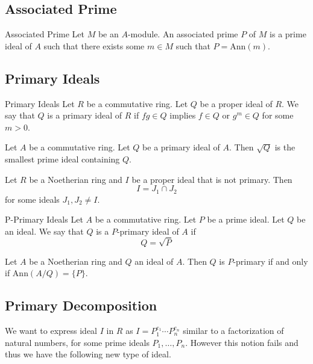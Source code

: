 \documentclass[a4paper]{article}
\begin{document}
\subsection{Associated Prime}
\begin{defn}{Associated Prime}{} Let $M$ be an $A$-module. An associated prime $P$ of $M$ is a prime ideal of $A$ such that there exists some $m\in M$ such that $P=\text{Ann}(m)$. 
\end{defn}

\subsection{Primary Ideals}
\begin{defn}{Primary Ideals}{} Let $R$ be a commutative ring. Let $Q$ be a proper ideal of $R$. We say that $Q$ is a primary ideal of $R$ if $fg\in Q$ implies $f\in Q$ or $g^m\in Q$ for some $m>0$. 
\end{defn}

\begin{lmm}{}{} Let $A$ be a commutative ring. Let $Q$ be a primary ideal of $A$. Then $\sqrt{Q}$ is the smallest prime ideal containing $Q$. 
\end{lmm}

\begin{lmm}{}{} Let $R$ be a Noetherian ring and $I$ be a proper ideal that is not primary. Then $$I=J_1\cap J_2$$ for some ideals $J_1,J_2\neq I$. 
\end{lmm}

\begin{defn}{P-Primary Ideals}{} Let $A$ be a commutative ring. Let $P$ be a prime ideal. Let $Q$ be an ideal. We say that $Q$ is a $P$-primary ideal of $A$ if $$Q=\sqrt{P}$$
\end{defn}

\begin{thm}{}{} Let $A$ be a Noetherian ring and $Q$ an ideal of $A$. Then $Q$ is $P$-primary if and only if $\text{Ann}(A/Q)=\{P\}$. 
\end{thm}

\subsection{Primary Decomposition}
We want to express ideal $I$ in $R$ as $I=P_1^{e_1}\cdots P_n^{e_n}$ similar to a factorization of natural numbers, for some prime ideals $P_1,\dots,P_n$. However this notion fails and thus we have the following new type of ideal. 
\end{document}
